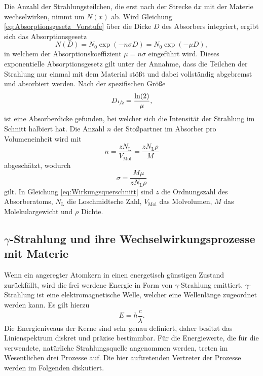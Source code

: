 Die Anzahl der Strahlungsteilchen, die erst nach der Strecke $\mathup{d}x$ mit der Materie wechselwirken, nimmt um $N(x)$ ab. 
Wird Gleichung \eqref{eq:Absorptionsgesetz_Vorstufe} über die Dicke $D$ des Absorbers integriert, ergibt sich das Absorptionsgesetz
\begin{equation}
	N(D)=N_0 \exp(-n \sigma D)=N_0 \exp(-\mu D),
	\label{eq:Absorptionsgesetz}
\end{equation}
in welchem der Absorptionskoeffizient $\mu=n\sigma$ eingeführt wird.
Dieses exponentielle Absorptionsgesetz gilt unter der Annahme, dass die Teilchen der Strahlung nur einmal mit dem Material stößt und dabei vollständig abgebremst und absorbiert werden.
Nach der spezifischen Größe
\begin{equation}
	D_{\sfrac{1}{2}}=\frac{\ln(2)}{\mu},
\end{equation}
ist eine Absorberdicke gefunden, bei welcher sich die Intensität der Strahlung im Schnitt halbiert hat.
Die Anzahl $n$ der Stoßpartner im Absorber pro Volumeneinheit wird mit
\begin{equation}
	n=\frac{zN_\text{L}}{V_\text{Mol}}=\frac{zN_\text{L}\rho}{M}
\end{equation}
abgeschätzt, wodurch 
\begin{equation}
	\sigma=\frac{M\mu}{zN_\text{L}\rho}
	\label{eq:Wirkungsquerschnitt}
\end{equation}
gilt.
In Gleichung \ref{eq:Wirkungsquerschnitt} sind $z$ die Ordnungszahl des Absorberatoms, $N_\text{L}$ die Loschmidtsche Zahl, $V_\text{Mol}$ das Molvolumen, $M$ das Molekulargewicht und $\rho$ Dichte.

\subsection{\texorpdfstring{$\gamma$}{Gamma}-Strahlung und ihre Wechselwirkungsprozesse mit Materie}
\label{sec:gamma}
Wenn ein angeregter Atomkern in einen energetisch günstigen Zustand zurückfällt, wird die frei werdene Energie in Form von $\gamma$-Strahlung emittiert. 
$\gamma$-Strahlung ist eine elektromagnetische Welle, welcher eine Wellenlänge zugeordnet werden kann. 
Es gilt hierzu
\begin{equation}
	E =h\frac{c}{\lambda}.
\end{equation}
Die Energieniveaus der Kerne sind sehr genau definiert, daher besitzt das Linienspektrum diskret und präzise bestimmbar.
Für die Energiewerte, die für die verwendete, natürliche Strahlungsquelle angenommen werden, treten im Wesentlichen drei Prozesse auf.
Die hier auftretenden Vertreter der Prozesse werden im Folgenden diskutiert.

